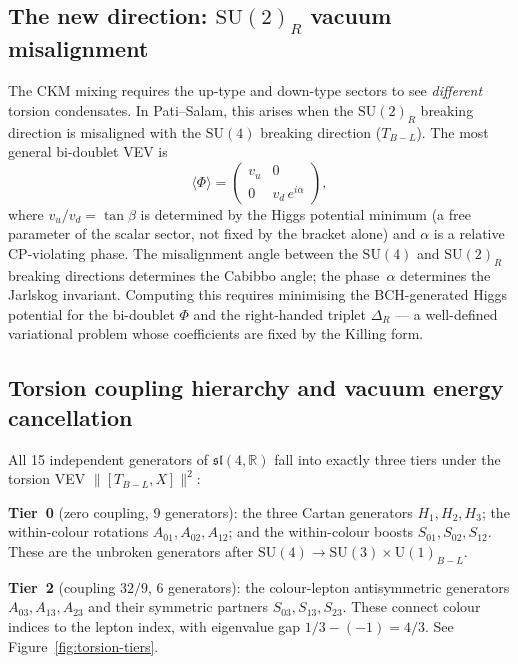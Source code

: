 \documentclass[11pt,a4paper]{article}
\theoremstyle{plain}
\theoremstyle{definition}
\theoremstyle{remark}
\begin{document}
\subsection*{The new direction: $\mathrm{SU}(2)_R$ vacuum misalignment}

The CKM mixing requires the up-type and down-type sectors to see
\emph{different} torsion condensates.  In Pati--Salam, this arises
when the $\mathrm{SU}(2)_R$ breaking direction is misaligned with the
$\mathrm{SU}(4)$ breaking direction ($T_{B{-}L}$).  The most general
bi-doublet VEV is
\[
  \langle\Phi\rangle = \begin{pmatrix} v_u & 0 \\ 0 & v_d\,e^{i\alpha} \end{pmatrix},
\]
where $v_u/v_d = \tan\beta$ is determined by the Higgs potential minimum
(a free parameter of the scalar sector, not fixed by the bracket alone) and
$\alpha$ is a relative CP-violating phase.  The misalignment angle
between the $\mathrm{SU}(4)$ and $\mathrm{SU}(2)_R$ breaking
directions determines the Cabibbo angle; the phase~$\alpha$
determines the Jarlskog invariant.  Computing this requires
minimising the BCH-generated Higgs potential for the bi-doublet
$\Phi$ and the right-handed triplet $\Delta_R$ --- a well-defined
variational problem whose coefficients are fixed by the Killing form.

\subsection{Torsion coupling hierarchy and vacuum energy cancellation}
\label{sec:torsion-hierarchy}

All 15 independent generators of $\mathfrak{sl}(4,\mathbb{R})$ fall
into exactly three tiers under the torsion VEV $\|[T_{B{-}L}, X]\|^2$:

\medskip
\noindent
\textbf{Tier~0} (zero coupling, 9 generators):
the three Cartan generators $H_1, H_2, H_3$;
the within-colour rotations $A_{01}, A_{02}, A_{12}$;
and the within-colour boosts $S_{01}, S_{02}, S_{12}$.
These are the unbroken generators after
$\mathrm{SU}(4) \to \mathrm{SU}(3) \times \mathrm{U}(1)_{B{-}L}$.

\medskip
\noindent
\textbf{Tier~2} (coupling $32/9$, 6 generators):
the colour-lepton antisymmetric generators $A_{03}, A_{13}, A_{23}$
and their symmetric partners $S_{03}, S_{13}, S_{23}$.
These connect colour indices to the lepton index, with eigenvalue
gap $1/3 - (-1) = 4/3$.
See Figure~\ref{fig:torsion-tiers}.
\end{document}
